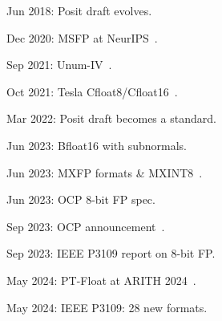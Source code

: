 \begin{frame}[t]
{\scriptsize
\vspace{-2mm}
\begin{myenumerate}
    \item<1-> Jun 2018: Posit draft evolves.
    \item<2-> Dec 2020: MSFP at NeurIPS~\cite{rouhani_pushing_2020}.
    \item<3-> Sep 2021: Unum-IV~\cite{serodio2021unum}.
    \item<4-> Oct 2021: Tesla Cfloat8/Cfloat16~\cite{talpes_dojo_2022}.
    \item<5-> Mar 2022: Posit draft becomes a standard.
    \item<6-> Jun 2023: Bfloat16 with subnormals.
    \item<6-> Jun 2023: MXFP formats & MXINT8~\cite{darvish_rouhani_shared_2023}.
    \item<6-> Jun 2023: OCP 8-bit FP spec.
    \item<7-> Sep 2023: OCP announcement~\cite{rouhani_microscaling_2023}.
    \item<7-> Sep 2023: IEEE P3109 report on 8-bit FP.
    \item<8-> May 2024: PT-Float at ARITH 2024~\cite{sousa2024ptfloat}.
    \item<8-> May 2024: IEEE P3109: 28 new formats.


\end{myenumerate}}
\end{frame}
